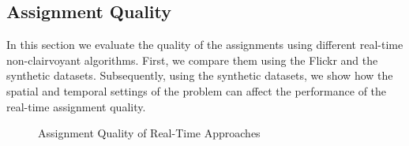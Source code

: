 

\subsection{Assignment Quality}
In this section we evaluate the quality of the assignments using different real-time non-clairvoyant algorithms. First, we compare them using the Flickr and the synthetic datasets. Subsequently, using the synthetic datasets, we show how the spatial and temporal settings of the problem can affect the performance of the real-time assignment quality.

\begin{figure}[h]
    \centering
    \vspace{-0.15in}
    \caption{Assignment Quality of Real-Time Approaches}
    \label{fig:quality}
\end{figure}

